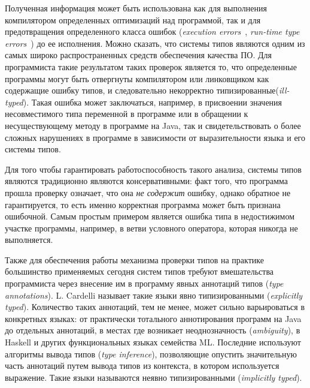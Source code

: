 
Полученная информация может быть использована как для выполнения компилятором
определенных оптимизаций над программой, так и для предотвращения определенного
класса ошибок (\emph{execution errors}~\cite{Cardelli2004}, \emph{run-time type
  errors}~\cite{Pierce2002}) до ее исполнения. Можно сказать, что системы типов
являются одним из самых широко распространенных средств обеспечения качества ПО.
Для программиста такие результатом таких проверок является то, что определенные
программы могут быть отвергнуты компилятором или линковщиком как содержащие
ошибку типов, и следовательно некорректно типизированные(\emph{ill-typed}).
Такая ошибка может заключаться, например, в присвоении значения несовместимого
типа переменной в программе или в обращении к несуществующему методу в программе
на Java, так и свидетельствовать о более сложных нарушениях в программе в
зависимости от выразительности языка и его системы типов.

Для того чтобы гарантировать работоспособность такого анализа, системы типов
являются традиционно являются консервативными: факт того, что программа
прошла проверку означает, что она \emph{не содержит} ошибку, однако обратное не
гарантируется, то есть именно корректная программа может быть признана ошибочной.
Самым простым примером является ошибка типа в недостижимом участке программы,
например, в ветви условного оператора, которая никогда не выполняется. 

Также для обеспечения работы механизма проверки типов на практике большинство применяемых
сегодня систем типов требуют вмешательства программиста через внесение им в программу
явных аннотаций типов (\emph{type annotations}). L. Cardelli называет такие
языки явно типизированными (\emph{explicitly typed}). Количество таких
аннотаций, тем не менее, может сильно варьироваться в конкретных языках: от
практически тотального аннотирования программ на Java до отдельных аннотаций, в
местах где возникает неоднозначность (\emph{ambiguity}), в Haskell и других
функциональных языках семейства ML. Последние используют алгоритмы вывода типов
(\emph{type inference}), позволяющие опустить значительную часть аннотаций
путем вывода типов из контекста, в котором используется выражение.  Такие языки
называются неявно типизированными (\emph{implicitly typed}). 

